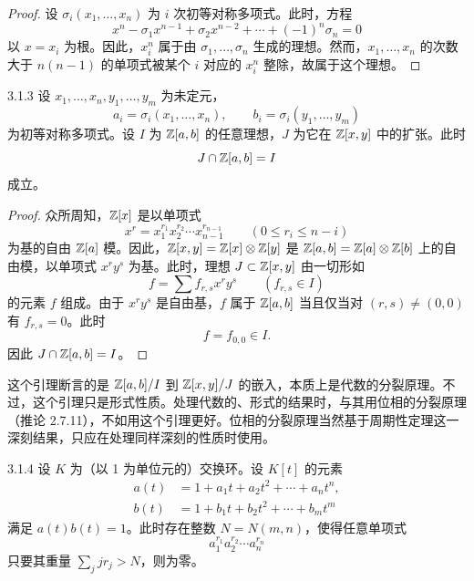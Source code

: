 \begin{proof}
设 $\sigma_i(x_1,\dots,x_n)$ 为 $i$ 次初等对称多项式。此时，方程
\[
x^n-\sigma_1x^{n-1}+\sigma_2x^{n-2}+\cdots+(-1)^n\sigma_n=0
\]
以 $x=x_i$ 为根。因此，$x_i^n$ 属于由 $\sigma_1,\dots,\sigma_n$ 生成的理想。然而，$x_1,\dots,x_n$ 的次数大于 $n(n-1)$ 的单项式被某个 $i$ 对应的 $x_i^n$ 整除，故属于这个理想。
\end{proof}


\begin{lemma*}{3.1.3}
设 $x_1,\dots,x_n,y_1,\dots,y_m$ 为未定元，
\[
a_i=\sigma_i(x_1,\dots,x_n),\qquad
b_i=\sigma_i(y_1,\dots,y_m)
\]
为初等对称多项式。设 $I$ 为 $\mathbb{Z}[a,b]$ 的任意理想，$J$ 为它在 $\mathbb{Z}[x,y]$ 中的扩张。此时
\[
J\cap\mathbb{Z}[a,b]=I
\]
成立。
\end{lemma*}

\begin{proof}
众所周知，$\mathbb{Z}[x]$ 是以单项式
\[
x^r=x_1^{r_1}x_2^{r_2}\cdots x_{n-1}^{r_{n-1}}\qquad(0\le r_i\le n-i)
\]
为基的自由 $\mathbb{Z}[a]$ 模。因此，$\mathbb{Z}[x,y]=\mathbb{Z}[x]\otimes\mathbb{Z}[y]$ 是 $\mathbb{Z}[a,b]=\mathbb{Z}[a]\otimes\mathbb{Z}[b]$ 上的自由模，以单项式 $x^ry^s$ 为基。此时，理想 $J\subset\mathbb{Z}[x,y]$ 由一切形如
\[
f=\sum f_{r,s}x^ry^s\qquad(f_{r,s}\in I)
\]
的元素 $f$ 组成。由于 $x^ry^s$ 是自由基，$f$ 属于 $\mathbb{Z}[a,b]$ 当且仅当对 $(r,s)\ne(0,0)$ 有 $f_{r,s}=0$。此时
\[
f=f_{0,0}\in I.
\]
因此 $J\cap\mathbb{Z}[a,b]=I$。
\end{proof}

\begin{remark}{}
这个引理断言的是 $\mathbb{Z}[a,b]/I$ 到 $\mathbb{Z}[x,y]/J$ 的嵌入，本质上是代数的分裂原理。不过，这个引理只是形式性质。处理代数的、形式的结果时，与其用位相的分裂原理（推论 2.7.11），不如用这个引理更好。位相的分裂原理当然基于周期性定理这一深刻结果，只应在处理同样深刻的性质时使用。
\end{remark}


\begin{lemma*}{3.1.4}
设 $K$ 为（以 1 为单位元的）交换环。设 $K[t]$ 的元素
\begin{align*}
a(t)&=1+a_1t+a_2t^2+\cdots+a_nt^n,\\
b(t)&=1+b_1t+b_2t^2+\cdots+b_mt^m
\end{align*}
满足 $a(t)b(t)=1$。此时存在整数 $N=N(m,n)$，使得任意单项式
\[
a_1^{r_1}a_2^{r_2}\cdots a_n^{r_n}
\]
只要其重量 $\sum_j jr_j>N$，则为零。
\end{lemma*}

